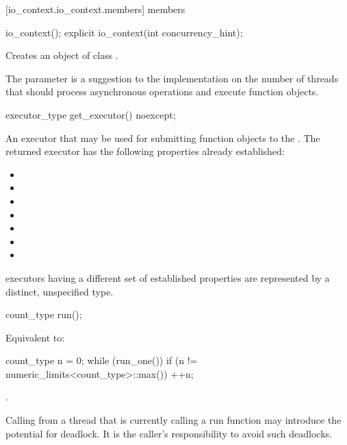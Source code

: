 [io_context.io_context.members]{ members}

%
\begin{itemdecl}
io_context();
explicit io_context(int concurrency_hint);
\end{itemdecl}

\begin{itemdescr}
\pnum
\effects Creates an object of class .

\pnum
\remarks The  parameter is a suggestion to the implementation on the number of threads that should process asynchronous operations and execute function objects.
\end{itemdescr}

%
\begin{itemdecl}
executor_type get_executor() noexcept;
\end{itemdecl}

\begin{itemdescr}
\pnum
\returns An executor that may be used for submitting function objects to the .
The returned executor has the following properties already established:
\begin{itemize}
\item
{}
\item
{}
\item
{}
\item
{}
\item
{}
\item
{}
\item
{}
\end{itemize}
\end{itemdescr}

\pnum
{} executors having a different set of established properties are represented by a distinct, unspecified type.

%
\begin{itemdecl}
count_type run();
\end{itemdecl}

\begin{itemdescr}
\pnum
\effects Equivalent to:
\begin{codeblock}
count_type n = 0;
while (run_one())
  if (n != numeric_limits<count_type>::max())
    ++n;
\end{codeblock}

\pnum
\returns {}.

\pnum
\begin{note}
Calling  from a thread that is currently calling a run function
may introduce the potential for deadlock.
It is the caller's responsibility to avoid such deadlocks.
\end{note}
\end{itemdescr}

